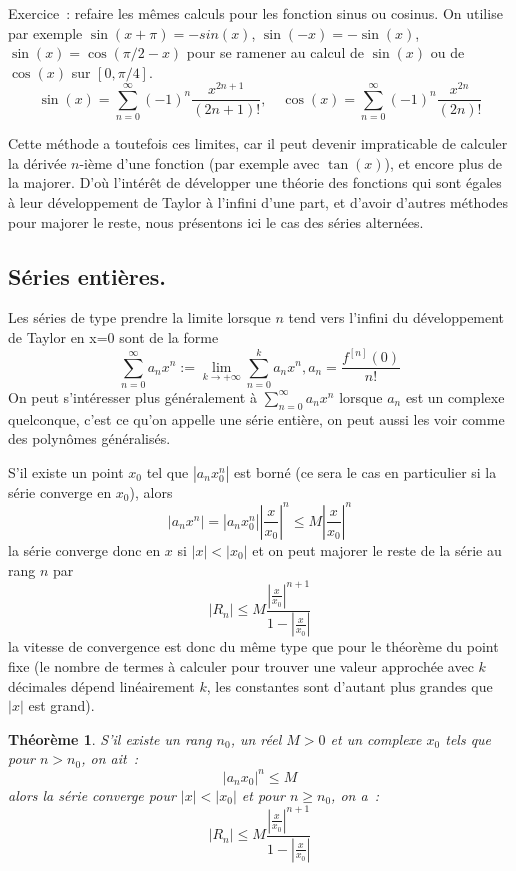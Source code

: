 \documentclass[a4paper,11pt]{article}
\newtheorem{thm}{Théorème}
\begin{document}
\begin{giacjshere}
Exercice~: refaire les mêmes calculs pour les fonction sinus ou cosinus.
On utilise par exemple $\sin(x+\pi)=-sin(x)$, $\sin(-x)=-\sin(x)$,
$\sin(x)=\cos(\pi/2-x)$ pour se ramener au calcul de $\sin(x)$ 
ou de $\cos(x)$ sur $[0,\pi/4]$.
\[ \sin(x)=\sum_{n=0}^\infty (-1)^n \frac{x^{2n+1}}{(2n+1)!},
\quad \cos(x)=\sum_{n=0}^\infty (-1)^n \frac{x^{2n}}{(2n)!} \]

Cette méthode a toutefois ces limites, car il peut devenir impraticable
de calculer la dérivée $n$-ième d'une fonction (par exemple avec $\tan(x)$),
et encore plus de la majorer. D'où l'intérêt de développer une théorie
des fonctions qui sont égales à leur développement de Taylor à l'infini
d'une part, et d'avoir d'autres méthodes pour majorer le reste, nous
présentons ici le cas des séries alternées.

\subsection{Séries entières.}
Les séries de type prendre la limite lorsque $n$ tend vers
l'infini du développement de Taylor en x=0 sont de la forme
\[ \sum_{n=0}^\infty a_n x^n := \lim_{ k \rightarrow +\infty} 
\sum_{n=0}^k a_n x^n, a_n=\frac{f^{[n]}(0)}{n!}
\]
On peut s'intéresser plus généralement à $\sum_{n=0}^\infty a_n x^n$
lorsque $a_n$ est un complexe quelconque, 
c'est ce qu'on appelle une série entière, on peut aussi les voir comme
des polynômes généralisés. 

S'il existe un point $x_0$ tel que 
$|a_n x_0^n|$ est born\'e (ce sera le cas en particulier 
si la s\'erie converge en $x_0$), alors
\[ |a_n x^n| = |a_n x_0^n| |\frac{x}{x_0}|^n \leq 
M |\frac{x}{x_0}|^n
\]
la s\'erie converge donc en $x$ si $|x|<|x_0|$ et on 
peut majorer le reste de la s\'erie au rang $n$ par 
\[ |R_n| \leq M \frac{ |\frac{x}{x_0}|^{n+1}} {1-|\frac{x}{x_0}|} 
\]
la vitesse de convergence est donc du m\^eme type que pour le
th\'eor\`eme du point fixe (le nombre de termes \`a calculer
pour trouver une valeur approch\'ee avec $k$ d\'ecimales 
d\'epend lin\'eairement $k$, les constantes sont d'autant
plus grandes que $|x|$ est grand).

\begin{thm}
S'il existe un rang $n_0$, un r\'eel $M>0$ et un complexe $x_0$ tels que 
pour $n>n_0$, on ait~:
\[ |a_n x_0|^n \leq M\]
alors la s\'erie converge pour $|x|<|x_0|$
et pour $n\geq n_0$, on a~:
\begin{equation} \label{eq:maj_serie_entiere}
|R_n| \leq M \frac{ |\frac{x}{x_0}|^{n+1}} {1-|\frac{x}{x_0}|} 
\end{equation}
\end{thm}


\end{giacjshere}
\end{document}
